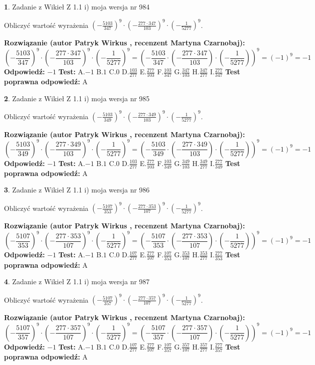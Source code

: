 \documentclass[12pt, a4paper]{article}
\theoremstyle{definition} %
\newtheorem{zad}{}
\newcommand{\zadStart}[1]{\begin{zad}#1\newline}
\newcommand{\zadStop}{\end{zad}}
\newcommand{\rozwStart}[2]{\noindent \textbf{Rozwiązanie (autor #1 , recenzent #2): }\newline}
\newcommand{\rozwStop}{\newline}
\newcommand{\odpStart}{\noindent \textbf{Odpowiedź:}\newline}
\newcommand{\odpStop}{\newline}
\newcommand{\testStart}{\noindent \textbf{Test:}\newline}
\newcommand{\testStop}{\newline}
\newcommand{\kluczStart}{\noindent \textbf{Test poprawna odpowiedź:}\newline}
\newcommand{\kluczStop}{\newline}
\begin{document}
\zadStart{Zadanie z Wikieł Z 1.1 i) moja wersja nr 984}

Obliczyć wartość wyrażenia $(-\frac{5103}{347})^{9} \cdot (-\frac{277 \cdot 347}{103})^{9} \cdot (-\frac{1}{5277})^{9}$.
\zadStop
\rozwStart{Patryk Wirkus}{Martyna Czarnobaj}
$$(-\frac{5103}{347})^{9} \cdot (-\frac{277 \cdot 347}{103})^{9} \cdot (-\frac{1}{5277})^{9} = (-\frac{5103}{347} \cdot (-\frac{277 \cdot 347}{103}) \cdot (-\frac{1}{5277}))^{9} = (-1)^{9} = -1$$
\rozwStop
\odpStart
$-1$
\odpStop
\testStart
A.$-1$ B.$1$ C.$0$ D.$\frac{103}{277}$ E.$\frac{277}{103}$
F.$\frac{103}{347}$ G.$\frac{347}{103}$
H.$\frac{347}{277}$
I.$\frac{277}{347}$
\testStop
\kluczStart
A
\kluczStop



\zadStart{Zadanie z Wikieł Z 1.1 i) moja wersja nr 985}

Obliczyć wartość wyrażenia $(-\frac{5103}{349})^{9} \cdot (-\frac{277 \cdot 349}{103})^{9} \cdot (-\frac{1}{5277})^{9}$.
\zadStop
\rozwStart{Patryk Wirkus}{Martyna Czarnobaj}
$$(-\frac{5103}{349})^{9} \cdot (-\frac{277 \cdot 349}{103})^{9} \cdot (-\frac{1}{5277})^{9} = (-\frac{5103}{349} \cdot (-\frac{277 \cdot 349}{103}) \cdot (-\frac{1}{5277}))^{9} = (-1)^{9} = -1$$
\rozwStop
\odpStart
$-1$
\odpStop
\testStart
A.$-1$ B.$1$ C.$0$ D.$\frac{103}{277}$ E.$\frac{277}{103}$
F.$\frac{103}{349}$ G.$\frac{349}{103}$
H.$\frac{349}{277}$
I.$\frac{277}{349}$
\testStop
\kluczStart
A
\kluczStop



\zadStart{Zadanie z Wikieł Z 1.1 i) moja wersja nr 986}

Obliczyć wartość wyrażenia $(-\frac{5107}{353})^{9} \cdot (-\frac{277 \cdot 353}{107})^{9} \cdot (-\frac{1}{5277})^{9}$.
\zadStop
\rozwStart{Patryk Wirkus}{Martyna Czarnobaj}
$$(-\frac{5107}{353})^{9} \cdot (-\frac{277 \cdot 353}{107})^{9} \cdot (-\frac{1}{5277})^{9} = (-\frac{5107}{353} \cdot (-\frac{277 \cdot 353}{107}) \cdot (-\frac{1}{5277}))^{9} = (-1)^{9} = -1$$
\rozwStop
\odpStart
$-1$
\odpStop
\testStart
A.$-1$ B.$1$ C.$0$ D.$\frac{107}{277}$ E.$\frac{277}{107}$
F.$\frac{107}{353}$ G.$\frac{353}{107}$
H.$\frac{353}{277}$
I.$\frac{277}{353}$
\testStop
\kluczStart
A
\kluczStop



\zadStart{Zadanie z Wikieł Z 1.1 i) moja wersja nr 987}

Obliczyć wartość wyrażenia $(-\frac{5107}{357})^{9} \cdot (-\frac{277 \cdot 357}{107})^{9} \cdot (-\frac{1}{5277})^{9}$.
\zadStop
\rozwStart{Patryk Wirkus}{Martyna Czarnobaj}
$$(-\frac{5107}{357})^{9} \cdot (-\frac{277 \cdot 357}{107})^{9} \cdot (-\frac{1}{5277})^{9} = (-\frac{5107}{357} \cdot (-\frac{277 \cdot 357}{107}) \cdot (-\frac{1}{5277}))^{9} = (-1)^{9} = -1$$
\rozwStop
\odpStart
$-1$
\odpStop
\testStart
A.$-1$ B.$1$ C.$0$ D.$\frac{107}{277}$ E.$\frac{277}{107}$
F.$\frac{107}{357}$ G.$\frac{357}{107}$
H.$\frac{357}{277}$
I.$\frac{277}{357}$
\testStop
\kluczStart
A
\kluczStop
\end{document}
